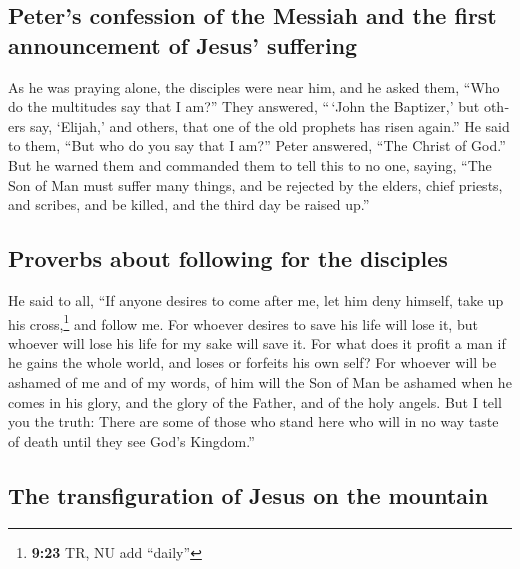 \begin{paracol}{2}
\begin{otherlanguage}{english}
{\subsection{Peter's confession of the Messiah and the first announcement
of Jesus'
suffering}\label{peters-confession-of-the-messiah-and-the-first-announcement-of-jesus-suffering}}

 As he was praying alone, the disciples were near him,
and he asked them, ``Who do the multitudes say that I am?''
 They answered, ``\,`John the Baptizer,' but others say,
`Elijah,' and others, that one of the old prophets has risen again.''
 He said to them, ``But who do you say that I am?'' Peter
answered, ``The Christ of God.''  But he warned them and
commanded them to tell this to no one,  saying, ``The Son
of Man must suffer many things, and be rejected by the elders, chief
priests, and scribes, and be killed, and the third day be raised up.''

\hypertarget{proverbs-about-following-for-the-disciples}{%
\subsection{Proverbs about following for the
disciples}\label{proverbs-about-following-for-the-disciples}}

 He said to all, ``If anyone desires to come after me,
let him deny himself, take up his cross,\footnote{\textbf{9:23} TR, NU
  add ``daily''} and follow me.  For whoever desires to
save his life will lose it, but whoever will lose his life for my sake
will save it.  For what does it profit a man if he gains
the whole world, and loses or forfeits his own self?  For
whoever will be ashamed of me and of my words, of him will the Son of
Man be ashamed when he comes in his glory, and the glory of the Father,
and of the holy angels.  But I tell you the truth: There
are some of those who stand here who will in no way taste of death until
they see God's Kingdom.''

\hypertarget{the-transfiguration-of-jesus-on-the-mountain}{%
\subsection{The transfiguration of Jesus on the
mountain}\label{the-transfiguration-of-jesus-on-the-mountain}}


\end{otherlanguage}
\end{paracol}
